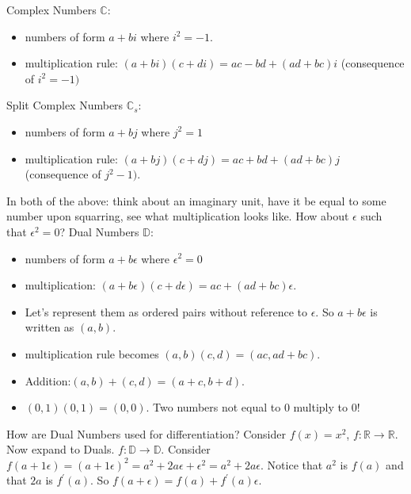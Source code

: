 \documentclass[11pt]{article}
\theoremstyle{definition}
\theoremstyle{plain}
\renewcommand{\b}[1]{\mathbb{#1}}
\begin{document}
\noindent Complex Numbers $\b{C}$:
\begin{itemize}
    \item numbers of form $a + bi$ where $i^2=-1$.
    \item multiplication rule: $(a+bi)(c+di) = ac - bd + (ad + bc)i$ 
          (consequence of $i^2=-1)$
\end{itemize}

\noindent Split Complex Numbers $\b{C}_s$:
\begin{itemize}
    \item numbers of form $a + bj$ where $j^2=1$ 
    \item multiplication rule: $(a + bj)(c + dj) = ac + bd + (ad + bc)j$ 
          (consequence of $j^2-1)$.
\end{itemize}

\noindent In both of the above: think about an imaginary unit, 
have it be equal to some number upon squarring, see what multiplication looks like.
How about $\epsilon$ such that $\epsilon^2=0$? Dual Numbers $\b{D}$: 
\begin{itemize}
    \item numbers of form $a + b \epsilon$ where $\epsilon^2 = 0$
    \item multiplication: $(a + b \epsilon)(c + d \epsilon) = ac + (ad+bc)\epsilon$.
    \item Let's represent them as ordered pairs without reference to $\epsilon$.
    So $a + b\epsilon$ is written as $(a,b)$.
    \item multiplication rule becomes $(a,b)(c,d)=(ac,ad+bc)$. 
    \item Addition:$(a,b)+(c,d)=(a+c,b+d)$.
    \item $(0,1)(0,1)=(0,0)$. Two numbers not equal to $0$ multiply
    to $0$!
\end{itemize}

\noindent How are Dual Numbers used for differentiation?
Consider $f(x)=x^2$, $f: \b{R} \rightarrow \b{R}$.
Now expand to Duals. $f: \b{D} \rightarrow \b{D}$.
Consider $f(a + 1\epsilon) = (a+1\epsilon)^2 = a^2 + 2a\epsilon + \epsilon^2 
= a^2 + 2a \epsilon $. Notice that $a^2$ is $f(a)$ and that $2a$ is $f^\prime(a)$.
So $f(a+\epsilon) = f(a) + f^\prime(a)\epsilon$.\\
\end{document}
